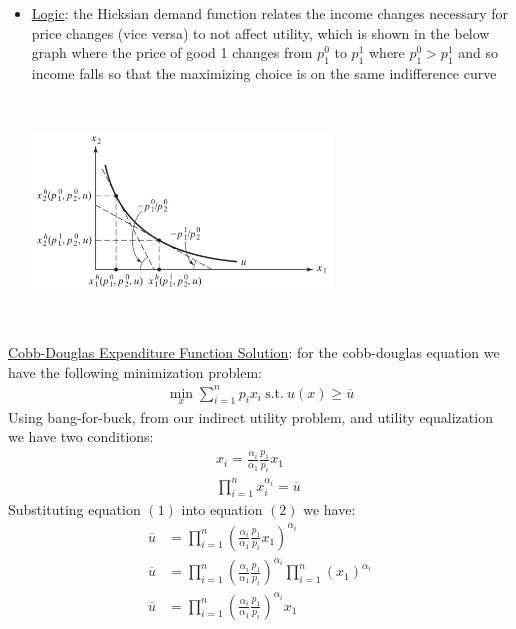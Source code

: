 \documentclass{article}
\begin{document}
  \begin{itemize}
    \item  \underline{Logic}: the Hicksian demand function relates the income changes necessary for price changes (vice versa) to not affect utility, which is shown in the below graph where the price of good 1 changes from $p_{1}^{0}$ to $p_{1}^{1}$ where $p_{1}^{0} > p_{1}^{1}$ and so income falls so that the maximizing choice is on the same indifference curve
    \\
    \begin{center}
      \includegraphics[width=8cm, height=6cm]{pic24}
    \end{center}
  \end{itemize}
  \par
  \underline{Cobb-Douglas Expenditure Function Solution}: for the cobb-douglas equation we have the following minimization problem:
  \begin{gather*}
    \min_{x} \sum_{i=1}^{n}p_{i}x_{i} \ \text{s.t.} \ u(x) \geq \overline{u}
  \end{gather*}
  Using bang-for-buck, from our indirect utility problem, and utility equalization we have two conditions:
  \begin{gather*}
    x_{i} = \frac{\alpha_{i}}{\alpha_{1}}\frac{p_{1}}{p_{i}}x_{1} \ \tag{1} \\
    \prod_{i=1}^{n}x_{i}^{\alpha_{i}} = \overline{u} \ \tag{2}
  \end{gather*}
  Substituting equation $(1)$ into equation $(2)$ we have:
  \begin{align*}
    \overline{u} &= \prod_{i=1}^{n}(\frac{\alpha_{i}}{\alpha_{1}}\frac{p_{1}}{p_{i}}x_{1})^{\alpha_{i}} \\
    \overline{u} &= \prod_{i=1}^{n}(\frac{\alpha_{i}}{\alpha_{1}}\frac{p_{1}}{p_{i}})^{\alpha_{i}} \prod_{i=1}^{n}(x_{1})^{\alpha_{i}} \\
    \overline{u} &= \prod_{i=1}^{n}(\frac{\alpha_{i}}{\alpha_{1}}\frac{p_{1}}{p_{i}})^{\alpha_{i}}x_{1} \ \tag{*}
  \end{align*}
\end{document}
